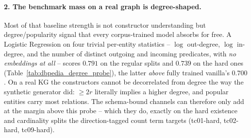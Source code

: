 \documentclass[a4paper,oneside,bibliography=totoc]{scrbook}
\begin{document}
\paragraph{2. The benchmark mass on a real graph is degree-shaped.}
Most of that baseline strength is not constructor understanding but
degree/popularity signal that every corpus-trained model absorbs for free. A
Logistic Regression on four trivial per-entity statistics -- $\log$ out-degree,
$\log$ in-degree, and the number of distinct outgoing and incoming predicates,
with \emph{no embeddings at all} -- scores $0.791$ on the regular splits and
$0.739$ on the hard ones (Table~\ref{tab:dbpedia_degree_probe}), the latter
\emph{above} fully trained vanilla's $0.700$. On a real KG the constructors
cannot be decorrelated from degree the way the synthetic generator did: $\geq 2r$
literally implies a higher degree, and popular entities carry most relations. The
schema-bound channels can therefore only add at the margin above this probe -- 
which they do, exactly on the hard existence and cardinality splits the
direction-tagged count term targets (tc01-hard, tc02-hard, tc09-hard).
\end{document}
